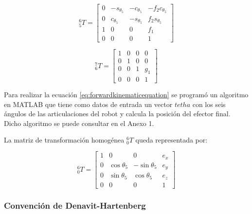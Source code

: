 \begin{multicols}{2}
\[
{}_{5}^{6}T = 
\begin{bmatrix}
    0 & -s_{\theta_5} & -c_{\theta_5} & -f_{2}c_{\theta_5}  \\
    0 & c_{\theta_5} & -s_{\theta_5} & f_{2}s_{\theta_5} \\
    1 & 0 & 0 & f_1 \\
    0 & 0 & 0 & 1
\end{bmatrix}
\]

\[
{}_{6}^{7}T = 
\begin{bmatrix}
    1 & 0 & 0 & 0 \\
    0 & 1 & 0 & 0 \\
    0 & 0 & 1 & {g}_1 \\
    0 & 0 & 0 & 1
\end{bmatrix}
\]

\end{multicols}

Para realizar la ecuación \ref{eq:forwardkinematicequation} se programó un algoritmo en MATLAB que tiene como datos de entrada un vector $tetha$ con los seis ángulos de las articulaciones del robot y calcula la posición del efector final. Dicho algoritmo se puede consultar en el Anexo 1.

La matriz de transformación homogénea ${}_{0}^{6}T$ queda representada por:

\[
{}_{0}^{6}T = 
\begin{bmatrix}
    1 & 0 & 0 & e_x  \\
    0 & \cos{\theta_5} & -\sin{\theta_5} & e_y \\
    0 & \sin{\theta_5} & \cos{\theta_5} & e_z \\
    0 & 0 & 0 & 1
\end{bmatrix}
\]

\subsubsection{Convención de Denavit-Hartenberg}


